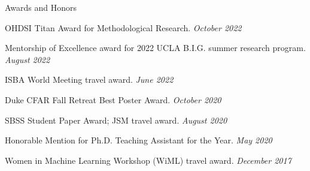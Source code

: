 \documentclass{resume} %
\begin{document}



%


\begin{rSection}{Awards and Honors}

OHDSI Titan Award for Methodological Research. 
\hfill {\em October 2022}

Mentorship of Excellence award for 2022 UCLA B.I.G. summer research program. \hfill {\em August 2022}

ISBA World Meeting travel award.
\hfill {\em June 2022}

Duke CFAR Fall Retreat Best Poster Award. 
\hfill {\em October 2020}

SBSS Student Paper Award; JSM travel award. \hfill {\em August 2020}

Honorable Mention for Ph.D. Teaching Assistant for the Year. 
\hfill {\em May 2020}

Women in Machine Learning Workshop (WiML) travel award. \hfill {\em December 2017}

\end{rSection}


\end{document}
